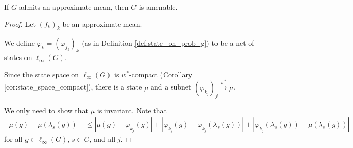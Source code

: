 \begin{proposition}\label{prop:approx_mean_implies_amenable}
  If $G$ admits an approximate mean, then $G$ is amenable.
\end{proposition}
\begin{proof}
  Let $\left(f_k\right)_k$ be an approximate mean.\newline

  We define $\varphi_k = \left(\varphi_{f_k}\right)_k$ (as in Definition \ref{def:state_on_prob_g}) to be a net of states on $\ell_{\infty}\left(G\right)$.\newline

  Since the state space on $\ell_{\infty}\left(G\right)$ is $w^{\ast}$-compact (Corollary \ref{cor:state_space_compact}), there is a state $\mu$ and a subnet $\left(\varphi_{k_j}\right)_j \xrightarrow{w^{\ast}}\mu$. \newline

  We only need to show that $\mu$ is invariant. Note that
  \begin{align*}
    \left\vert \mu\left(g\right) - \mu\left(\lambda_s\left(g\right)\right) \right\vert &\leq \left\vert \mu\left(g\right) - \varphi_{k_j}\left(g\right) \right\vert + \left\vert \varphi_{k_j}\left(g\right) - \varphi_{k_j}\left(\lambda_s\left(g\right)\right) \right\vert + \left\vert \varphi_{k_j}\left(\lambda_s\left(g\right)\right) - \mu\left(\lambda_s\left(g\right)\right) \right\vert
  \end{align*}
  for all $g\in \ell_{\infty}\left(G\right)$, $s\in G$, and all $j$.\newline


\end{proof}
